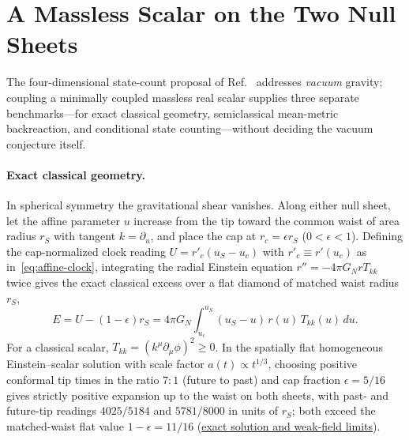 \documentclass[10pt,a4paper]{article}
\numberwithin{equation}{section}
\newcommand{\repo}[2]{\href{https://github.com/sprajs/quantum-gravity/blob/main/#1}{#2}}
\begin{document}
\section{A Massless Scalar on the Two Null Sheets}
\label{sec:matter}

The four-dimensional state-count proposal of Ref.~\cite{Chandrasekaran2026} addresses \emph{vacuum} gravity; coupling a minimally coupled massless real scalar supplies three separate benchmarks---for exact classical geometry, semiclassical mean-metric backreaction, and conditional state counting---without deciding the vacuum conjecture itself.

\paragraph{Exact classical geometry.}
In spherical symmetry the gravitational shear vanishes. Along either null sheet, let the affine parameter $u$ increase from the tip toward the common waist of area radius $r_S$ with tangent $k=\partial_u$, and place the cap at $r_c=\epsilon r_S$ ($0<\epsilon<1$). Defining the cap-normalized clock reading $U=r'_c(u_S-u_c)$ with $r'_c\equiv r'(u_c)$ as in~\eqref{eq:affine-clock}, integrating the radial Einstein equation $r''=-4\pi G_N rT_{kk}$ twice gives the exact classical excess over a flat diamond of matched waist radius $r_S$,
\begin{equation}
  E = U - (1-\epsilon)r_S
    = 4\pi G_N\int_{u_c}^{u_S}(u_S-u)\,r(u)\,T_{kk}(u)\,du.
  \label{eq:matter-excess}
\end{equation}
For a classical scalar, $T_{kk}=(k^\mu\partial_\mu\phi)^2\ge 0$. In the spatially flat homogeneous Einstein--scalar solution with scale factor $a(t)\propto t^{1/3}$, choosing positive conformal tip times in the ratio $7:1$ (future to past) and cap fraction $\epsilon=5/16$ gives strictly positive expansion up to the waist on both sheets, with past- and future-tip readings $4025/5184$ and $5781/8000$ in units of $r_S$; both exceed the matched-waist flat value $1-\epsilon=11/16$ (\repo{audit/matter-diamond.md}{exact solution and weak-field limits}).
\end{document}
